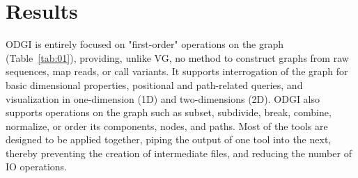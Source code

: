\documentclass{bioinfo}
\begin{document}
\begin{methods}
%
%
%
%

    \end{methods}


    \section{Results}

    ODGI is entirely focused on "first-order" operations on the graph (Table~\ref{tab:01}), providing, unlike VG, no
    method to construct graphs from raw sequences, map reads, or call variants. It supports interrogation of the graph
    for basic dimensional properties, positional and path-related queries, and visualization in one-dimension (1D) and
    two-dimensions (2D). ODGI also supports operations on the graph such as subset, subdivide, break, combine,
    normalize, or order its components, nodes, and paths. Most of the tools are designed to be applied together,
    piping the output of one tool into the next, thereby preventing the creation of intermediate files, and reducing
    the number of IO operations.
\end{document}
